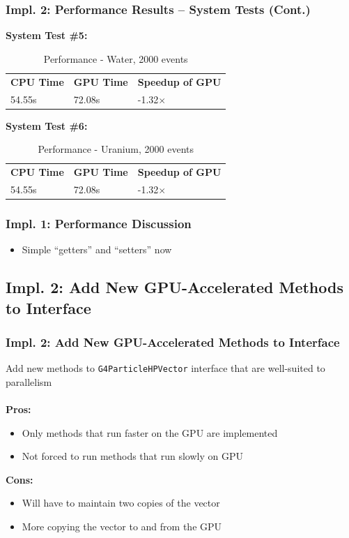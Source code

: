 \documentclass{beamer}
\newcommand\pro{\item[$+$]}
\newcommand\con{\item[$-$]}
\begin{document}
\begin{frame}
\frametitle{Impl. 2: Performance Results -- System Tests (Cont.)}
\textbf{System Test \#5:}\\
\begin{table}
		\caption{Performance - Water, 2000 events}
		\begin{tabular}{lll}
		\bf CPU Time&\bf  GPU Time&\bf Speedup of GPU\\
		54.55s&72.08s&-1.32$\times$\\
		\end{tabular}
\end{table}
\textbf{System Test \#6:}\\
\begin{table}
		\caption{Performance - Uranium, 2000 events}
		\begin{tabular}{lll}
		\bf CPU Time&\bf  GPU Time&\bf Speedup of GPU\\
		54.55s&72.08s&-1.32$\times$\\
		\end{tabular}
\end{table}
\end{frame}

\begin{frame}
\frametitle{Impl. 1: Performance Discussion}
\begin{itemize}
\item Simple ``getters'' and ``setters'' now 
\end{itemize}
\end{frame}


\subsection{Impl. 2: Add New GPU-Accelerated Methods to Interface}
\begin{frame}
\frametitle{Impl. 2: Add New GPU-Accelerated Methods to Interface}
Add new methods to \texttt{G4ParticleHPVector} interface that are well-suited to parallelism\\~\\

\textbf{Pros:}
\begin{itemize}
\pro Only methods that run faster on the GPU are implemented
\pro Not forced to run methods that run slowly on GPU
\end{itemize}

\textbf{Cons:}
\begin{itemize}
\con Will have to maintain two copies of the vector
\con More copying the vector to and from the GPU
\end{itemize}
\end{frame}
\end{document}
